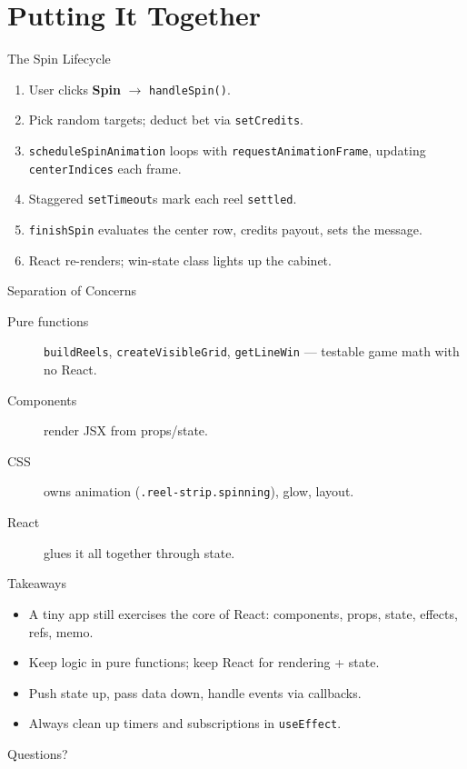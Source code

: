 \documentclass{beamer}
\begin{document}
\section{Putting It Together}

\begin{frame}{The Spin Lifecycle}
  \begin{enumerate}
    \item User clicks \textbf{Spin} $\rightarrow$ \texttt{handleSpin()}.
    \item Pick random targets; deduct bet via \texttt{setCredits}.
    \item \texttt{scheduleSpinAnimation} loops with \texttt{requestAnimationFrame}, updating \texttt{centerIndices} each frame.
    \item Staggered \texttt{setTimeout}s mark each reel \texttt{settled}.
    \item \texttt{finishSpin} evaluates the center row, credits payout, sets the message.
    \item React re-renders; win-state class lights up the cabinet.
  \end{enumerate}
\end{frame}

\begin{frame}{Separation of Concerns}
  \begin{description}
    \item[Pure functions] \texttt{buildReels}, \texttt{createVisibleGrid}, \texttt{getLineWin} --- testable game math with no React.
    \item[Components] render JSX from props/state.
    \item[CSS] owns animation (\texttt{.reel-strip.spinning}), glow, layout.
    \item[React] glues it all together through state.
  \end{description}
\end{frame}

\begin{frame}{Takeaways}
  \begin{itemize}
    \item A tiny app still exercises the core of React: components, props, state, effects, refs, memo.
    \item Keep logic in pure functions; keep React for rendering + state.
    \item Push state up, pass data down, handle events via callbacks.
    \item Always clean up timers and subscriptions in \texttt{useEffect}.
  \end{itemize}
\end{frame}

\begin{frame}[standout]
  Questions?
\end{frame}
\end{document}
